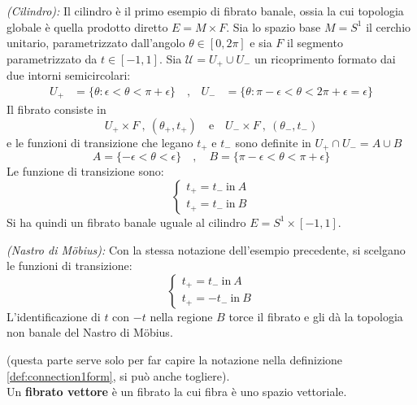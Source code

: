 \begin{example}\emph{(Cilindro): }\label{ex:cilindro}
   Il cilindro è il primo esempio di fibrato banale, ossia la cui topologia globale
   è quella prodotto diretto $E = M\times F$. Sia lo spazio base $M=S^1$ il cerchio
   unitario, parametrizzato dall'angolo $\theta \in [0,2\pi]$ e sia $F$ il segmento
   parametrizzato da $t \in [-1,1]$. Sia $\mathcal{U} = U_+ \cup U_-$ un ricoprimento
   formato dai due intorni semicircolari:
   \begin{equation*}
      \begin{aligned}
         U_+ &= \{\theta : \epsilon < \theta < \pi + \epsilon \} \quad ,&
         U_- &= \{\theta : \pi - \epsilon < \theta < 2\pi + \epsilon = \epsilon \}
      \end{aligned}
   \end{equation*}
   Il fibrato consiste in
      $$ U_+ \times F \: , \: (\theta_+,t_+) \mathrm{\quad e \quad}
         U_- \times F \: , \: (\theta_-,t_-) $$
  e le funzioni di transizione che legano $t_+$ e $t_-$ sono definite in
  $U_+\cap U_- = A \cup B$
  $$ A = \{ -\epsilon < \theta < \epsilon \} \quad , \quad
     B = \{ \pi-\epsilon < \theta < \pi + \epsilon \} $$
  Le funzione di transizione sono:
  $$ \begin{cases}
     t_+= t_- \mathrm{\: in \:} A \\
     t_+= t_- \mathrm{\: in \:} B
  \end{cases}$$
  Si ha quindi un fibrato banale uguale al cilindro $E = S^1 \times [-1,1]$.\\
\end{example}

\begin{example}\emph{(Nastro di Möbius): }\label{ex:mobius}
   Con la stessa notazione dell'esempio precedente, si scelgano le funzioni di
   transizione:
   $$ \begin{cases}
      t_+= t_- \mathrm{\: in \:} A \\
      t_+= -t_- \mathrm{\: in \:} B
   \end{cases}$$
   L'identificazione di $t$ con $-t$ nella regione $B$ torce il fibrato e gli dà
   la topologia non banale del Nastro di Möbius.
\end{example}

(questa parte serve solo per far capire la notazione nella definizione \ref{def:connection1form},
si può anche togliere).\\

Un \textbf{fibrato vettore} è un fibrato la cui fibra è uno spazio vettoriale.\\

